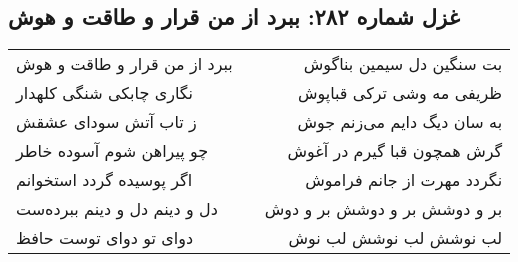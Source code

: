 \begin{center}
\section*{غزل شماره ۲۸۲: ببرد از من قرار و طاقت و هوش}
\label{sec:sh282}
\begin{longtable}{l p{0.5cm} r}
ببرد از من قرار و طاقت و هوش
&&
بت سنگین دل سیمین بناگوش
\\
نگاری چابکی شنگی کلهدار
&&
ظریفی مه وشی ترکی قباپوش
\\
ز تاب آتش سودای عشقش
&&
به سان دیگ دایم می‌زنم جوش
\\
چو پیراهن شوم آسوده خاطر
&&
گرش همچون قبا گیرم در آغوش
\\
اگر پوسیده گردد استخوانم
&&
نگردد مهرت از جانم فراموش
\\
دل و دینم دل و دینم ببرده‌ست
&&
بر و دوشش بر و دوشش بر و دوش
\\
دوای تو دوای توست حافظ
&&
لب نوشش لب نوشش لب نوش
\\
\end{longtable}
\end{center}
